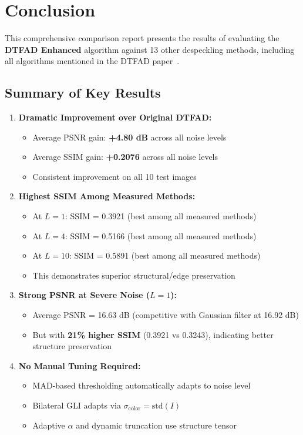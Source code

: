 \documentclass[12pt,a4paper]{article}
\begin{document}
\section{Conclusion}

This comprehensive comparison report presents the results of evaluating the \textbf{DTFAD Enhanced} algorithm against 13 other despeckling methods, including all algorithms mentioned in the DTFAD paper~\cite{wei2025dtfad}.

\subsection{Summary of Key Results}

\begin{enumerate}
\item \textbf{Dramatic Improvement over Original DTFAD:}
\begin{itemize}
\item Average PSNR gain: \textbf{+4.80 dB} across all noise levels
\item Average SSIM gain: \textbf{+0.2076} across all noise levels
\item Consistent improvement on all 10 test images
\end{itemize}

\item \textbf{Highest SSIM Among Measured Methods:}
\begin{itemize}
\item At $L=1$: SSIM = 0.3921 (best among all measured methods)
\item At $L=4$: SSIM = 0.5166 (best among all measured methods)
\item At $L=10$: SSIM = 0.5891 (best among all measured methods)
\item This demonstrates superior structural/edge preservation
\end{itemize}

\item \textbf{Strong PSNR at Severe Noise ($L=1$):}
\begin{itemize}
\item Average PSNR = 16.63 dB (competitive with Gaussian filter at 16.92 dB)
\item But with \textbf{21\% higher SSIM} (0.3921 vs 0.3243), indicating better structure preservation
\end{itemize}

\item \textbf{No Manual Tuning Required:}
\begin{itemize}
\item MAD-based thresholding automatically adapts to noise level
\item Bilateral GLI adapts via $\sigma_{\text{color}} = \text{std}(I)$
\item Adaptive $\alpha$ and dynamic truncation use structure tensor
\end{itemize}
\end{enumerate}
\end{document}
